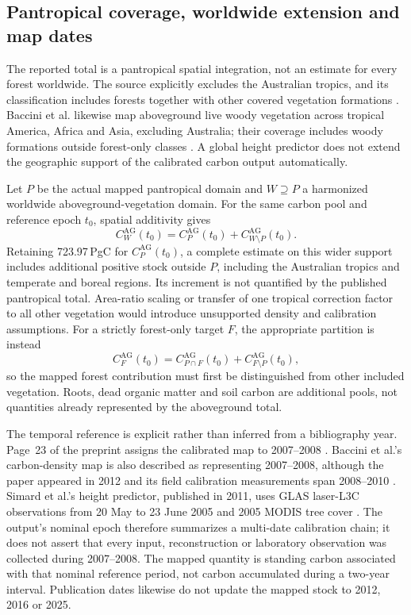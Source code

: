 \documentclass[11pt,a4paper]{article}
\theoremstyle{remark}
\begin{document}
\subsection{Pantropical coverage, worldwide extension and map dates}\label{sec:scope}
The reported total is a pantropical spatial integration, not an estimate for every forest worldwide. The source explicitly excludes the Australian tropics, and its classification includes forests together with other covered vegetation formations \citep[pp.~23--24, Table~3 and Fig.~9]{Arellano2016}. Baccini et al. likewise map aboveground live woody vegetation across tropical America, Africa and Asia, excluding Australia; their coverage includes woody formations outside forest-only classes \citep[p.~182 and Fig.~1]{Baccini2012}. A global height predictor does not extend the geographic support of the calibrated carbon output automatically.

Let $P$ be the actual mapped pantropical domain and $W\supseteq P$ a harmonized worldwide aboveground-vegetation domain. For the same carbon pool and reference epoch $t_0$, spatial additivity gives
\[
 C_W^{\mathrm{AG}}(t_0)
 =C_P^{\mathrm{AG}}(t_0)+C_{W\setminus P}^{\mathrm{AG}}(t_0).
\]
Retaining 723.97\,PgC for $C_P^{\mathrm{AG}}(t_0)$, a complete estimate on this wider support includes additional positive stock outside $P$, including the Australian tropics and temperate and boreal regions. Its increment is not quantified by the published pantropical total. Area-ratio scaling or transfer of one tropical correction factor to all other vegetation would introduce unsupported density and calibration assumptions. For a strictly forest-only target $F$, the appropriate partition is instead
\[
 C_F^{\mathrm{AG}}(t_0)
 =C_{P\cap F}^{\mathrm{AG}}(t_0)+C_{F\setminus P}^{\mathrm{AG}}(t_0),
\]
so the mapped forest contribution must first be distinguished from other included vegetation. Roots, dead organic matter and soil carbon are additional pools, not quantities already represented by the aboveground total.

The temporal reference is explicit rather than inferred from a bibliography year. Page~23 of the preprint assigns the calibrated map to 2007--2008 \citep{Arellano2016}. Baccini et al.'s carbon-density map is also described as representing 2007--2008, although the paper appeared in 2012 and its field calibration measurements span 2008--2010 \citep[p.~182]{Baccini2012}. Simard et al.'s height predictor, published in 2011, uses GLAS laser-L3C observations from 20 May to 23 June 2005 and 2005 MODIS tree cover \citep[Section~2.2]{Simard2011}. The output's nominal epoch therefore summarizes a multi-date calibration chain; it does not assert that every input, reconstruction or laboratory observation was collected during 2007--2008. The mapped quantity is standing carbon associated with that nominal reference period, not carbon accumulated during a two-year interval. Publication dates likewise do not update the mapped stock to 2012, 2016 or 2025.
\end{document}
